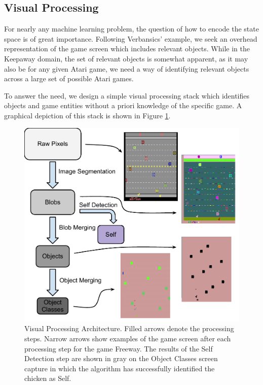 \documentclass{article}
\begin{document}
\subsection{Visual Processing}

For nearly any machine learning problem, the question of how to encode the state space is of great importance. Following Verbansics' example, we seek an overhead representation of the game screen which includes relevant objects. While in the Keepaway domain, the set of relevant objects is somewhat apparent, as it may also be for any given Atari game, we need a way of identifying relevant objects across a large set of possible Atari games.

To answer the need, we design a simple visual processing stack which identifies objects and game entities without a priori knowledge of the specific game. A graphical depiction of this stack is shown in Figure \ref{fig:visproc}.

\begin{figure}[htp]
\begin{center}
\includegraphics[scale=.8]{figures/AtariArch}
\end{center}
\caption{Visual Processing Architecture. Filled arrows denote the processing steps. Narrow arrows show examples of the game screen after each processing step for the game Freeway. The results of the Self Detection step are shown in gray on the Object Classes screen capture in which the algorithm has successfully identified the chicken as Self.}
\label{fig:visproc}
\end{figure}
\end{document}
